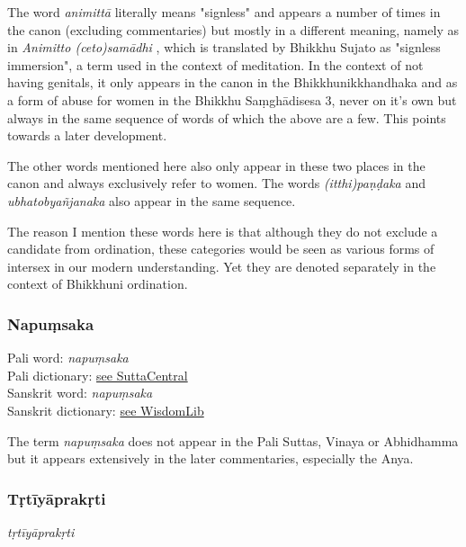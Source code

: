 The word {\em animittā } literally means "signless" and appears a number of times in the canon (excluding commentaries) but mostly in a different meaning, namely as in {\em Animitto (ceto)samādhi }, which is translated by Bhikkhu Sujato as "signless immersion", a term used in the context of meditation. In the context of not having genitals, it only appears in the canon in the Bhikkhunikkhandhaka and as a form of abuse for women in the Bhikkhu Saṃ­ghā­di­sesa­ 3, never on it's own but always in the same sequence of words of which the above are a few. This points towards a later development.

The other words mentioned here also only appear in these two places in the canon and always exclusively refer to women. The words {\em (itthi)paṇḍaka } and {\em ubhatob­yañ­janaka } also appear in the same sequence.

The reason I mention these words here is that although they do not exclude a candidate from ordination, these categories would be seen as various forms of intersex in our modern understanding. Yet they are denoted separately in the context of Bhikkhuni ordination. 


\subsubsection{Napuṃsaka}

Pali word: {\em napuṃsaka} \\
Pali dictionary: \href{https://suttacentral.net/define/napu%E1%B9%83saka}{see SuttaCentral} \\
Sanskrit word: {\em napuṃsaka} \\
Sanskrit dictionary: \href{https://www.wisdomlib.org/definition/napumsaka}{see WisdomLib} \\

\medskip


The term {\em napuṃsaka} does not appear in the Pali Suttas, Vinaya or Abhidhamma but it appears extensively in the later commentaries, especially the Anya. 

\subsubsection{Tṛtīyāprakṛti}

{\em tṛtīyāprakṛti}


